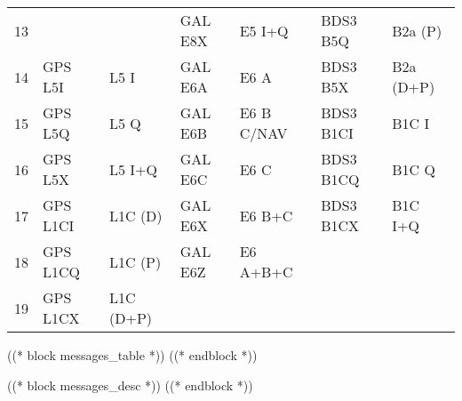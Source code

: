 \documentclass[9pt]{extarticle}
\numberwithin{table}{subsection}
\numberwithin{field}{subsection}
\begin{document}
\begin{center}
\begin{longtable}{l|ll|ll|ll}
    13                     &             &                    & GAL E8X      & E5 I+Q       & BDS3 B5Q     & B2a (P)     \\
    14                     & GPS L5I     & L5 I               & GAL E6A      & E6 A         & BDS3 B5X     & B2a (D+P)   \\
    15                     & GPS L5Q     & L5 Q               & GAL E6B      & E6 B C/NAV   & BDS3 B1CI    & B1C I       \\
    16                     & GPS L5X     & L5 I+Q             & GAL E6C      & E6 C         & BDS3 B1CQ    & B1C Q       \\
    17                     & GPS L1CI    & L1C (D)            & GAL E6X      & E6 B+C       & BDS3 B1CX    & B1C I+Q     \\
    18                     & GPS L1CQ    & L1C (P)            & GAL E6Z      & E6 A+B+C     &              &             \\
    19                     & GPS L1CX    & L1C (D+P)          &              &              &              &             \\
    \bottomrule
  \end{longtable}
\end{center}

((* block messages_table *))
((* endblock *))

((* block messages_desc *))
((* endblock *))
\end{document}

